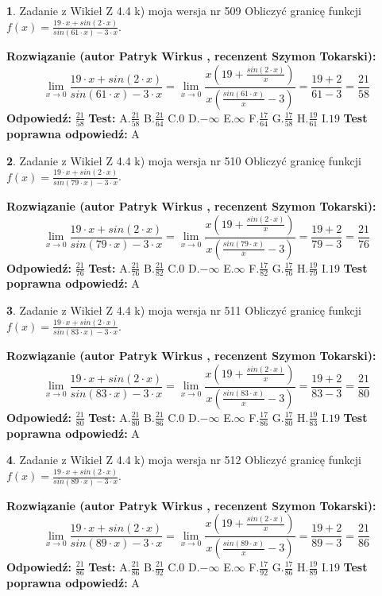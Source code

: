\documentclass[12pt, a4paper]{article}
\theoremstyle{definition} %
\newtheorem{zad}{}
\newcommand{\zadStart}[1]{\begin{zad}#1\newline}
\newcommand{\zadStop}{\end{zad}}
\newcommand{\rozwStart}[2]{\noindent \textbf{Rozwiązanie (autor #1 , recenzent #2): }\newline}
\newcommand{\rozwStop}{\newline}
\newcommand{\odpStart}{\noindent \textbf{Odpowiedź:}\newline}
\newcommand{\odpStop}{\newline}
\newcommand{\testStart}{\noindent \textbf{Test:}\newline}
\newcommand{\testStop}{\newline}
\newcommand{\kluczStart}{\noindent \textbf{Test poprawna odpowiedź:}\newline}
\newcommand{\kluczStop}{\newline}
\begin{document}
\zadStart{Zadanie z Wikieł Z 4.4 k) moja wersja nr 509}
Obliczyć granicę funkcji $f(x)=\frac{19\cdot x +sin(2\cdot x)}{sin(61\cdot x) -3\cdot x}$.
\zadStop
\rozwStart{Patryk Wirkus}{Szymon Tokarski}
$$\lim\limits_{x\to 0}\frac{19\cdot x +sin(2\cdot x)}{sin(61\cdot x) -3\cdot x}
=\lim\limits_{x\to 0}\frac{x(19+\frac{sin(2\cdot x)}{x})}{x(\frac{sin(61\cdot x)}{x}-3)}
=\frac{19+2}{61-3} = \frac{21}{58}$$
\rozwStop
\odpStart
$\frac{21}{58}$
\odpStop
\testStart
A.$\frac{21}{58}$
B.$\frac{21}{64}$
C.$0$
D.$-\infty$
E.$\infty$
F.$\frac{17}{64}$
G.$\frac{17}{58}$
H.$\frac{19}{61}$
I.$19$
\testStop
\kluczStart
A
\kluczStop



\zadStart{Zadanie z Wikieł Z 4.4 k) moja wersja nr 510}
Obliczyć granicę funkcji $f(x)=\frac{19\cdot x +sin(2\cdot x)}{sin(79\cdot x) -3\cdot x}$.
\zadStop
\rozwStart{Patryk Wirkus}{Szymon Tokarski}
$$\lim\limits_{x\to 0}\frac{19\cdot x +sin(2\cdot x)}{sin(79\cdot x) -3\cdot x}
=\lim\limits_{x\to 0}\frac{x(19+\frac{sin(2\cdot x)}{x})}{x(\frac{sin(79\cdot x)}{x}-3)}
=\frac{19+2}{79-3} = \frac{21}{76}$$
\rozwStop
\odpStart
$\frac{21}{76}$
\odpStop
\testStart
A.$\frac{21}{76}$
B.$\frac{21}{82}$
C.$0$
D.$-\infty$
E.$\infty$
F.$\frac{17}{82}$
G.$\frac{17}{76}$
H.$\frac{19}{79}$
I.$19$
\testStop
\kluczStart
A
\kluczStop



\zadStart{Zadanie z Wikieł Z 4.4 k) moja wersja nr 511}
Obliczyć granicę funkcji $f(x)=\frac{19\cdot x +sin(2\cdot x)}{sin(83\cdot x) -3\cdot x}$.
\zadStop
\rozwStart{Patryk Wirkus}{Szymon Tokarski}
$$\lim\limits_{x\to 0}\frac{19\cdot x +sin(2\cdot x)}{sin(83\cdot x) -3\cdot x}
=\lim\limits_{x\to 0}\frac{x(19+\frac{sin(2\cdot x)}{x})}{x(\frac{sin(83\cdot x)}{x}-3)}
=\frac{19+2}{83-3} = \frac{21}{80}$$
\rozwStop
\odpStart
$\frac{21}{80}$
\odpStop
\testStart
A.$\frac{21}{80}$
B.$\frac{21}{86}$
C.$0$
D.$-\infty$
E.$\infty$
F.$\frac{17}{86}$
G.$\frac{17}{80}$
H.$\frac{19}{83}$
I.$19$
\testStop
\kluczStart
A
\kluczStop



\zadStart{Zadanie z Wikieł Z 4.4 k) moja wersja nr 512}
Obliczyć granicę funkcji $f(x)=\frac{19\cdot x +sin(2\cdot x)}{sin(89\cdot x) -3\cdot x}$.
\zadStop
\rozwStart{Patryk Wirkus}{Szymon Tokarski}
$$\lim\limits_{x\to 0}\frac{19\cdot x +sin(2\cdot x)}{sin(89\cdot x) -3\cdot x}
=\lim\limits_{x\to 0}\frac{x(19+\frac{sin(2\cdot x)}{x})}{x(\frac{sin(89\cdot x)}{x}-3)}
=\frac{19+2}{89-3} = \frac{21}{86}$$
\rozwStop
\odpStart
$\frac{21}{86}$
\odpStop
\testStart
A.$\frac{21}{86}$
B.$\frac{21}{92}$
C.$0$
D.$-\infty$
E.$\infty$
F.$\frac{17}{92}$
G.$\frac{17}{86}$
H.$\frac{19}{89}$
I.$19$
\testStop
\kluczStart
A
\kluczStop
\end{document}

